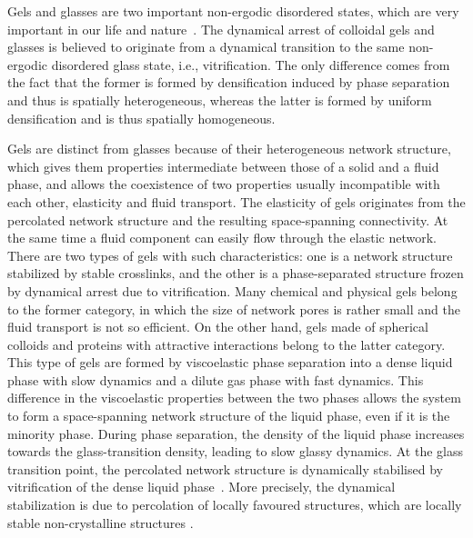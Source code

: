 \documentclass[twocolumn,superscriptaddress,showpacs,preprintnumbers,
amsmath,amssymb,prl]{revtex4-1}
\begin{document}
\maketitle
Gels and glasses are two important non-ergodic disordered states, which are very important 
in our life and nature~\cite{anderson2002insights,lekkerkerker2011colloids}.
The dynamical arrest of colloidal gels and glasses is believed to originate from a dynamical transition to the same non-ergodic disordered glass state, i.e., vitrification. The only difference comes from the fact that the former is formed by densification induced by phase separation and thus is spatially heterogeneous, whereas the latter is formed by uniform densification and is thus spatially homogeneous.

Gels are distinct from glasses because of their heterogeneous network structure, which gives them properties intermediate between
those of a solid and a fluid phase, and allows the coexistence of two properties usually incompatible with each other, 
elasticity and fluid transport. 
The elasticity of gels originates from the percolated network structure and the resulting space-spanning connectivity. 
At the same time a fluid component can easily flow through the elastic network.
There are two types of gels with such characteristics: one is a network structure stabilized by stable crosslinks, and the other is a phase-separated structure frozen by dynamical arrest due to vitrification.
Many chemical and physical gels belong to the former category, in which the size of network pores is rather small and 
the fluid transport is not so efficient. On the other hand, gels made of spherical colloids and proteins 
with attractive interactions belong to the latter category. 
This type of gels are formed by viscoelastic phase separation \cite{tanaka1999colloid,tanaka2000viscoelastic} into a dense liquid phase with slow dynamics and a dilute gas phase 
with fast dynamics. This difference in the viscoelastic properties between the two phases allows the system to form a space-spanning 
network structure of the liquid phase, even if it is the minority phase. During phase separation, the density of the liquid phase 
increases towards the glass-transition density, leading to slow glassy dynamics.
At the glass transition point, the percolated network structure is dynamically stabilised by vitrification 
of the dense liquid phase~\cite{pusey1993dynamics,ilett1995phase,verhaegh1997transient,tanaka1999colloid,foffi2002,zaccarelli2007,lu2008gelation,zaccarelli2008gelation,testard2011}.  
More precisely, the dynamical stabilization is due to percolation of locally favoured structures, which are locally stable non-crystalline structures \cite{royall2008g}.
\end{document}

